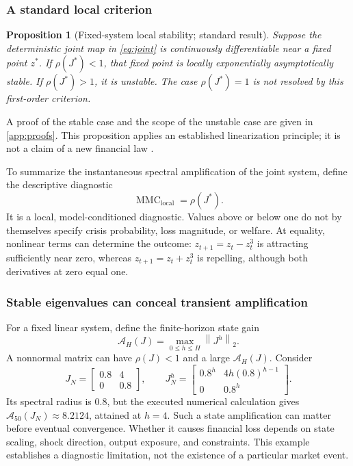 \documentclass[10pt,twocolumn,letterpaper]{article}
\newtheorem{proposition}[theorem]{Proposition}
\theoremstyle{definition}
\theoremstyle{remark}
\newcommand{\norm}[1]{\left\lVert #1\right\rVert}
\newcommand{\MMC}{\operatorname{MMC}}
\begin{document}
\subsubsection{A standard local criterion}
\begin{proposition}[Fixed-system local stability; standard result]
\label{prop:local}
Suppose the deterministic joint map in \cref{eq:joint} is continuously differentiable near a fixed point $z^*$. If $\rho(J^*)<1$, that fixed point is locally exponentially asymptotically stable. If $\rho(J^*)>1$, it is unstable. The case $\rho(J^*)=1$ is not resolved by this first-order criterion.
\end{proposition}
A proof of the stable case and the scope of the unstable case are given in \cref{app:proofs}. This proposition applies an established linearization principle; it is not a claim of a new financial law \citep{khalil2002}.

To summarize the instantaneous spectral amplification of the joint system, define the descriptive diagnostic
\begin{equation}
 \MMC_{\mathrm{local}}=\rho(J^*).
 \label{eq:mmc}
\end{equation}
It is a local, model-conditioned diagnostic. Values above or below one do not by themselves specify crisis probability, loss magnitude, or welfare. At equality, nonlinear terms can determine the outcome: $z_{t+1}=z_t-z_t^3$ is attracting sufficiently near zero, whereas $z_{t+1}=z_t+z_t^3$ is repelling, although both derivatives at zero equal one.

\subsubsection{Stable eigenvalues can conceal transient amplification}
For a fixed linear system, define the finite-horizon state gain
\begin{equation}
 \mathcal A_H(J)=\max_{0\leq h\leq H}\norm{J^h}_2.
 \label{eq:gain}
\end{equation}
A nonnormal matrix can have $\rho(J)<1$ and a large $\mathcal A_H(J)$. Consider
\begin{equation}
 J_N=\begin{bmatrix}0.8&4\\0&0.8\end{bmatrix},\qquad
 J_N^h=\begin{bmatrix}0.8^h&4h(0.8)^{h-1}\\0&0.8^h\end{bmatrix}.
 \label{eq:nonnormal}
\end{equation}
Its spectral radius is $0.8$, but the executed numerical calculation gives $\mathcal A_{50}(J_N)\approx8.2124$, attained at $h=4$. Such a state amplification can matter before eventual convergence. Whether it causes financial loss depends on state scaling, shock direction, output exposure, and constraints. This example establishes a diagnostic limitation, not the existence of a particular market event.
\end{document}
